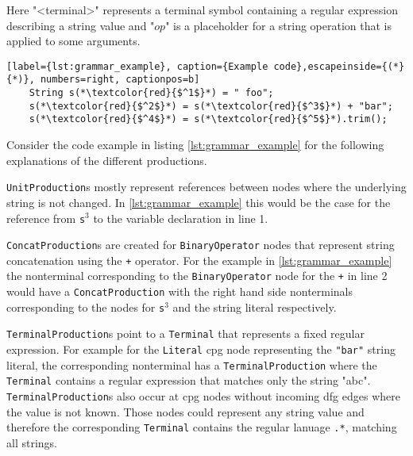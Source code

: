Here "<terminal>" represents a terminal symbol containing a regular expression describing a string value and "$op$" is a placeholder for a string operation that is applied to some arguments.

\begin{lstlisting}[label={lst:grammar_example}, caption={Example code},escapeinside={(*}{*)}, numbers=right, captionpos=b]
	String s(*\textcolor{red}{$^1$}*) = " foo";
	s(*\textcolor{red}{$^2$}*) = s(*\textcolor{red}{$^3$}*) + "bar";
	s(*\textcolor{red}{$^4$}*) = s(*\textcolor{red}{$^5$}*).trim();
\end{lstlisting}

Consider the code example in listing \ref{lst:grammar_example} for the following explanations of the different productions.

\lstinline|UnitProduction|s mostly represent references between nodes where the underlying string is not changed. In \ref{lst:grammar_example} this would be the case for the reference from \lstinline|s|$^3$ to the variable declaration in line 1. 

\lstinline|ConcatProduction|s are created for \lstinline|BinaryOperator| nodes that represent string concatenation using the \lstinline|+| operator. For the example in \ref{lst:grammar_example} the nonterminal corresponding to the \lstinline|BinaryOperator| node for the \lstinline|+| in line 2 would have a \lstinline|ConcatProduction| with the right hand side nonterminals corresponding to the nodes for \lstinline|s|$^3$ and the string literal respectively.

\lstinline|TerminalProduction|s point to a \lstinline|Terminal| that represents a fixed regular expression.
For example for the \lstinline|Literal| \ac{cpg} node representing the \lstinline|"bar"| string literal, the corresponding nonterminal has a \lstinline|TerminalProduction| where the \lstinline|Terminal| contains a regular expression that matches only the string "abc". \lstinline|TerminalProduction|s also occur at \ac{cpg} nodes without incoming \ac{dfg} edges where the value is not known. Those nodes could represent any string value and therefore the corresponding \lstinline|Terminal| contains the regular lanuage \lstinline|.*|, matching all strings.

